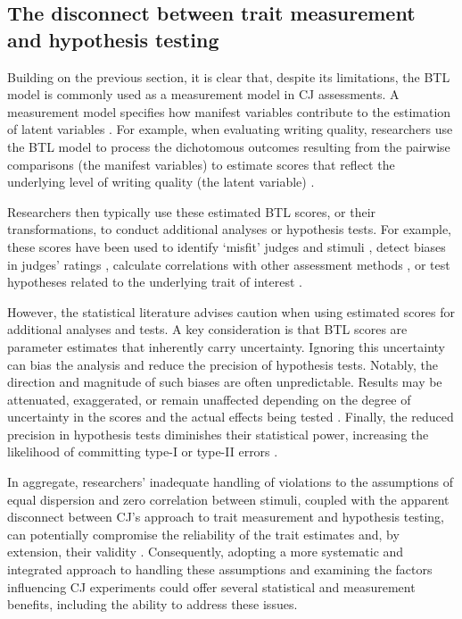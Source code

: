 \documentclass[
  authoryear,
  review,
  1p]{elsarticle}
\begin{document}
\subsection{The disconnect between trait measurement and hypothesis
testing}\label{sec-theory-issue2}

Building on the previous section, it is clear that, despite its
limitations, the BTL model is commonly used as a measurement model in CJ
assessments. A measurement model specifies how manifest variables
contribute to the estimation of latent variables
\citep{Everitt_et_al_2010}. For example, when evaluating writing
quality, researchers use the BTL model to process the dichotomous
outcomes resulting from the pairwise comparisons (the manifest
variables) to estimate scores that reflect the underlying level of
writing quality (the latent variable)
\citep{Laming_2004, Pollitt_2012b, Whitehouse_2012, vanDaal_et_al_2016, Lesterhuis_2018_thesis, Coertjens_et_al_2017, Goossens_et_al_2018, Bouwer_et_al_2023}.

Researchers then typically use these estimated BTL scores, or their
transformations, to conduct additional analyses or hypothesis tests. For
example, these scores have been used to identify `misfit' judges and
stimuli \citep{Pollitt_2012b, vanDaal_et_al_2016, Goossens_et_al_2018},
detect biases in judges' ratings
\citep{Pollitt_et_al_2003, Pollitt_2012b}, calculate correlations with
other assessment methods \citep{Goossens_et_al_2018, Bouwer_et_al_2023},
or test hypotheses related to the underlying trait of interest
\citep{Bramley_et_al_2019, Boonen_et_al_2020, Bouwer_et_al_2023, vanDaal_et_al_2017, Jones_et_al_2019, Gijsen_et_al_2021}.

However, the statistical literature advises caution when using estimated
scores for additional analyses and tests. A key consideration is that
BTL scores are parameter estimates that inherently carry uncertainty.
Ignoring this uncertainty can bias the analysis and reduce the precision
of hypothesis tests. Notably, the direction and magnitude of such biases
are often unpredictable. Results may be attenuated, exaggerated, or
remain unaffected depending on the degree of uncertainty in the scores
and the actual effects being tested
\citetext{\citealp[pp.~25]{Kline_et_al_2023}; \citealp[pp.~137]{Hoyle_et_al_2023}}.
Finally, the reduced precision in hypothesis tests diminishes their
statistical power, increasing the likelihood of committing type-I or
type-II errors \citep{McElreath_2020}.

In aggregate, researchers' inadequate handling of violations to the
assumptions of equal dispersion and zero correlation between stimuli,
coupled with the apparent disconnect between CJ's approach to trait
measurement and hypothesis testing, can potentially compromise the
reliability of the trait estimates and, by extension, their validity
\citep[pp.~2]{Perron_et_al_2015}. Consequently, adopting a more
systematic and integrated approach to handling these assumptions and
examining the factors influencing CJ experiments could offer several
statistical and measurement benefits, including the ability to address
these issues.
\end{document}

